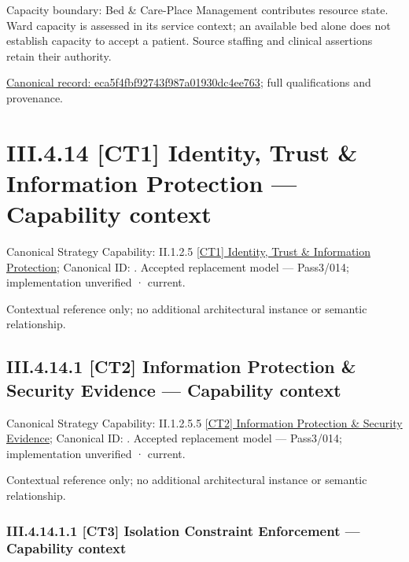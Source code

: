 Capacity boundary: Bed \& Care-Place Management contributes resource state. Ward capacity is assessed in its service context; an available bed alone does not establish capacity to accept a patient. Source staffing and clinical assertions retain their authority.


{\footnotesize \href{../../../../../../../../continuum/business/business-function/eca5f4fbf92743f987a01930dc4ee763.md}{Canonical record: eca5f4fbf92743f987a01930dc4ee763}; full qualifications and provenance.}\par
\section*{III.4.14 [CT1] Identity, Trust \& Information Protection — Capability context}
\label{navigation:III.4.14}

{\small Canonical Strategy Capability: II.1.2.5 \hyperref[element:def358c06649413ba4773582e0d5c6d4]{[CT1] Identity, Trust \& Information Protection}; Canonical ID: \texttt{}. Accepted replacement model — Pass3/014; implementation unverified · current.}\par
Contextual reference only; no additional architectural instance or semantic relationship.\par
\subsection*{III.4.14.1 [CT2] Information Protection \& Security Evidence — Capability context}
\label{navigation:III.4.14.1}

{\small Canonical Strategy Capability: II.1.2.5.5 \hyperref[element:ece1a982b80e46e0a868b4865dfcdfc3]{[CT2] Information Protection \& Security Evidence}; Canonical ID: \texttt{}. Accepted replacement model — Pass3/014; implementation unverified · current.}\par
Contextual reference only; no additional architectural instance or semantic relationship.\par
\subsubsection*{III.4.14.1.1 [CT3] Isolation Constraint Enforcement — Capability context}
\label{navigation:III.4.14.1.1}

